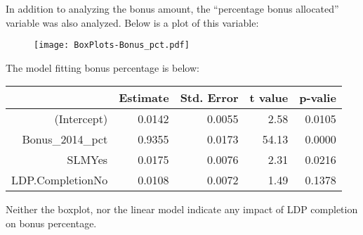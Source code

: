 \documentclass[11pt]{extarticle} %
\begin{document}
In addition to analyzing the bonus amount, the ``percentage bonus allocated'' variable was also analyzed. Below is a plot of this variable:
\begin{figure}[H]
\centering 
\texttt{[image: BoxPlots-Bonus\_pct.pdf]}
\end{figure}
The model fitting bonus percentage is below:
\begin{table}[H]
\centering
\begin{tabular}{rrrrr}
  \hline
 & Estimate & Std. Error & t value & p-valie \\ 
  \hline
(Intercept) & 0.0142 & 0.0055 & 2.58 & 0.0105 \\ 
  Bonus\_2014\_pct & 0.9355 & 0.0173 & 54.13 & 0.0000 \\ 
  SLMYes & 0.0175 & 0.0076 & 2.31 & 0.0216 \\ 
  LDP.CompletionNo & 0.0108 & 0.0072 & 1.49 & 0.1378 \\ 
   \hline
\end{tabular}
\end{table}
Neither the boxplot, nor the linear model indicate any impact of LDP completion on bonus percentage. 

\newpage
\end{document}
